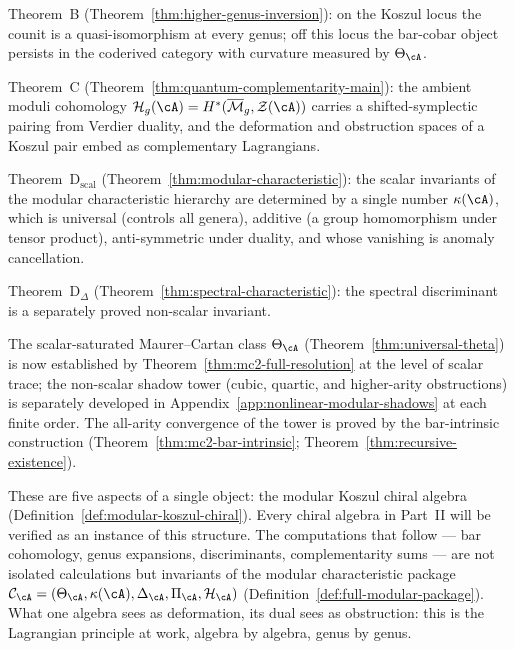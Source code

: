 Theorem~B
(Theorem~\ref{thm:higher-genus-inversion}): on the Koszul locus the
counit is a quasi-isomorphism at every genus; off this locus the
bar-cobar object persists in the coderived category with curvature
measured by $\Theta_{\cA}$.

Theorem~C
(Theorem~\ref{thm:quantum-complementarity-main}): the ambient
moduli cohomology $\mathcal{H}_g(\cA) =
H^*(\overline{\mathcal{M}}_g, \mathcal{Z}(\cA))$ carries a
shifted-symplectic pairing from Verdier duality, and the deformation
and obstruction spaces of a Koszul pair embed as complementary
Lagrangians.

Theorem~D$_{\mathrm{scal}}$
(Theorem~\ref{thm:modular-characteristic}): the scalar invariants
of the modular characteristic hierarchy are determined by a single
number $\kappa(\cA)$, which is universal (controls all genera),
additive (a group homomorphism under tensor product), anti-symmetric
under duality, and whose vanishing is anomaly cancellation.

Theorem~D$_\Delta$
(Theorem~\ref{thm:spectral-characteristic}): the spectral
discriminant is a separately proved non-scalar invariant.

The scalar-saturated Maurer--Cartan class $\Theta_{\cA}$
(Theorem~\ref{thm:universal-theta}) is now established by
Theorem~\ref{thm:mc2-full-resolution} at the level of scalar
trace; the non-scalar shadow tower
(cubic, quartic, and higher-arity obstructions)
is separately developed in
Appendix~\ref{app:nonlinear-modular-shadows} at each finite
order.  The all-arity convergence of the tower is proved by the
bar-intrinsic construction
(Theorem~\ref{thm:mc2-bar-intrinsic};
Theorem~\ref{thm:recursive-existence}).

These are five aspects of a single object: the modular Koszul chiral
algebra (Definition~\ref{def:modular-koszul-chiral}).  Every chiral
algebra in Part~II will be verified as an instance of this structure.
The computations that follow --- bar cohomology, genus expansions,
discriminants, complementarity sums --- are not
isolated calculations but invariants of the modular characteristic
package $\mathcal{C}_{\cA} = (\Theta_{\cA}, \kappa(\cA),
\Delta_{\cA}, \Pi_{\cA}, \mathcal{H}_{\cA})$
(Definition~\ref{def:full-modular-package}).
What one algebra sees as
deformation, its dual sees as obstruction: this is the Lagrangian
principle at work, algebra by algebra, genus by genus.



